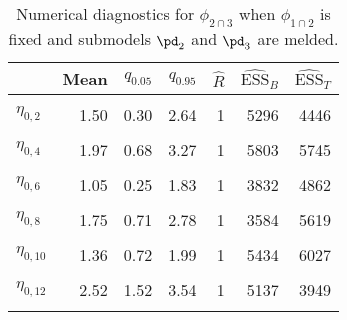 \begin{table}

\caption{Numerical diagnostics for $\phi_{2 \cap 3}$ when $\phi_{1 \cap 2}$ is fixed and submodels $\pd_{2}$ and $\pd_{3}$ are melded.}
\centering
\begin{tabular}[t]{lrrrrrr}
\toprule
  & Mean & $q_{0.05}$ & $q_{0.95}$ & $\widehat{R}$ & $\widehat{\text{ESS}}_{B}$ & $\widehat{\text{ESS}}_{T}$\\
\midrule
\cellcolor{gray!6}{$\eta_{0, 1}$} & \cellcolor{gray!6}{0.59} & \cellcolor{gray!6}{-0.25} & \cellcolor{gray!6}{1.43} & \cellcolor{gray!6}{1} & \cellcolor{gray!6}{5007} & \cellcolor{gray!6}{5967}\\
$\eta_{0, 2}$ & 1.50 & 0.30 & 2.64 & 1 & 5296 & 4446\\
\cellcolor{gray!6}{$\eta_{0, 3}$} & \cellcolor{gray!6}{3.22} & \cellcolor{gray!6}{2.26} & \cellcolor{gray!6}{4.22} & \cellcolor{gray!6}{1} & \cellcolor{gray!6}{4880} & \cellcolor{gray!6}{5972}\\
$\eta_{0, 4}$ & 1.97 & 0.68 & 3.27 & 1 & 5803 & 5745\\
\cellcolor{gray!6}{$\eta_{0, 5}$} & \cellcolor{gray!6}{1.24} & \cellcolor{gray!6}{0.17} & \cellcolor{gray!6}{2.31} & \cellcolor{gray!6}{1} & \cellcolor{gray!6}{5364} & \cellcolor{gray!6}{5291}\\
$\eta_{0, 6}$ & 1.05 & 0.25 & 1.83 & 1 & 3832 & 4862\\
\cellcolor{gray!6}{$\eta_{0, 7}$} & \cellcolor{gray!6}{4.04} & \cellcolor{gray!6}{2.63} & \cellcolor{gray!6}{5.46} & \cellcolor{gray!6}{1} & \cellcolor{gray!6}{5235} & \cellcolor{gray!6}{5274}\\
$\eta_{0, 8}$ & 1.75 & 0.71 & 2.78 & 1 & 3584 & 5619\\
\cellcolor{gray!6}{$\eta_{0, 9}$} & \cellcolor{gray!6}{1.13} & \cellcolor{gray!6}{0.20} & \cellcolor{gray!6}{2.04} & \cellcolor{gray!6}{1} & \cellcolor{gray!6}{5220} & \cellcolor{gray!6}{3970}\\
$\eta_{0, 10}$ & 1.36 & 0.72 & 1.99 & 1 & 5434 & 6027\\
\cellcolor{gray!6}{$\eta_{0, 11}$} & \cellcolor{gray!6}{2.20} & \cellcolor{gray!6}{1.41} & \cellcolor{gray!6}{3.00} & \cellcolor{gray!6}{1} & \cellcolor{gray!6}{5708} & \cellcolor{gray!6}{6563}\\
$\eta_{0, 12}$ & 2.52 & 1.52 & 3.54 & 1 & 5137 & 3949\\
\cellcolor{gray!6}{$\eta_{0, 13}$} & \cellcolor{gray!6}{2.21} & \cellcolor{gray!6}{1.28} & \cellcolor{gray!6}{3.11} & \cellcolor{gray!6}{1} & \cellcolor{gray!6}{5721} & \cellcolor{gray!6}{4985}\\

\end{tabular}
\end{table}
